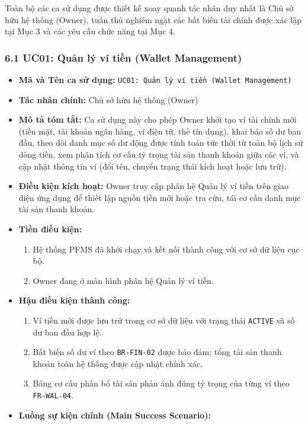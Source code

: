 \documentclass[11pt,a4paper]{article}
\providecommand{\tightlist}{
  \setlength{\itemsep}{0pt}\setlength{\parskip}{0pt}}
\begin{document}
Toàn bộ các ca sử dụng được thiết kế xoay quanh tác nhân duy nhất là Chủ
sở hữu hệ thống (Owner), tuân thủ nghiêm ngặt các bất biến tài chính
được xác lập tại Mục 3 và các yêu cầu chức năng tại Mục 4.

\subsubsection{6.1 UC01: Quản lý ví tiền (Wallet
Management)}\label{61-uc01-quux1ea3n-luxfd-vuxed-tiux1ec1n-wallet-management}

\begin{itemize}
\tightlist
\item
  \textbf{Mã và Tên ca sử dụng:}
  \texttt{UC01:\ Quản\ lý\ ví\ tiền\ (Wallet\ Management)}
\item
  \textbf{Tác nhân chính:} Chủ sở hữu hệ thống (Owner)
\item
  \textbf{Mô tả tóm tắt:} Ca sử dụng này cho phép Owner khởi tạo ví tài
  chính mới (tiền mặt, tài khoản ngân hàng, ví điện tử, thẻ tín dụng),
  khai báo số dư ban đầu, theo dõi danh mục số dư động được tính toán
  tức thời từ toàn bộ lịch sử dòng tiền, xem phân tích cơ cấu tỷ trọng
  tài sản thanh khoản giữa các ví, và cập nhật thông tin ví (đổi tên,
  chuyển trạng thái kích hoạt hoặc lưu trữ).
\item
  \textbf{Điều kiện kích hoạt:} Owner truy cập phân hệ Quản lý ví tiền
  trên giao diện ứng dụng để thiết lập nguồn tiền mới hoặc tra cứu, tái
  cơ cấu danh mục tài sản thanh khoản.
\item
  \textbf{Tiền điều kiện:}

  \begin{enumerate}
  \def\labelenumi{\arabic{enumi}.}
  \tightlist
  \item
    Hệ thống PFMS đã khởi chạy và kết nối thành công với cơ sở dữ liệu
    cục bộ.
  \item
    Owner đang ở màn hình phân hệ Quản lý ví tiền.
  \end{enumerate}
\item
  \textbf{Hậu điều kiện thành công:}

  \begin{enumerate}
  \def\labelenumi{\arabic{enumi}.}
  \tightlist
  \item
    Ví tiền mới được lưu trữ trong cơ sở dữ liệu với trạng thái
    \texttt{ACTIVE} và số dư ban đầu hợp lệ.
  \item
    Bất biến số dư ví theo \texttt{BR-FIN-02} được bảo đảm; tổng tài sản
    thanh khoản toàn hệ thống được cập nhật chính xác.
  \item
    Bảng cơ cấu phân bổ tài sản phản ánh đúng tỷ trọng của từng ví theo
    \texttt{FR-WAL-04}.
  \end{enumerate}
\item
  \textbf{Luồng sự kiện chính (Main Success Scenario):}


\end{itemize}
\end{document}
